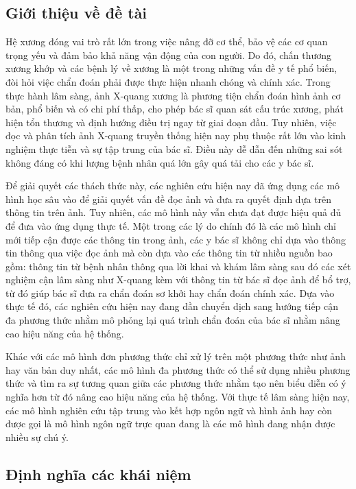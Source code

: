 \begin{refsection}
  \subsection{Giới thiệu về đề tài}

Hệ xương đóng vai trò rất lớn trong việc nâng đỡ cơ thể, bảo vệ các cơ quan trọng yếu và đảm bảo khả năng vận động của con người. Do đó, chấn thương xương khớp và các bệnh lý về xương là một trong những vấn đề y tế phổ biến, đòi hỏi việc chẩn đoán phải được thực hiện nhanh chóng và chính xác. Trong thực hành lâm sàng, ảnh X-quang xương là phương tiện chẩn đoán hình ảnh cơ bản, phổ biến và có chi phí thấp, cho phép bác sĩ quan sát cấu trúc xương, phát hiện tổn thương và định hướng điều trị ngay từ giai đoạn đầu. Tuy nhiên, việc đọc và phân tích ảnh X-quang truyền thống hiện nay phụ thuộc rất lớn vào kinh nghiệm thực tiễn và sự tập trung của bác sĩ. Điều này dễ dẫn đến những sai sót không đáng có khi lượng bệnh nhân quá lớn gây quá tải cho các y bác sĩ.

Để giải quyết các thách thức này, các nghiên cứu hiện nay đã ứng dụng các mô hình học sâu vào để giải quyết vấn đề đọc ảnh và đưa ra quyết định dựa trên thông tin trên ảnh. Tuy nhiên, các mô hình này vẫn chưa đạt được hiệu quả đủ để đưa vào ứng dụng thực tế. Một trong các lý do chính đó là các mô hình chỉ mới tiếp cận được các thông tin trong ảnh, các y bác sĩ không chỉ dựa vào thông tin thông qua việc đọc ảnh mà còn dựa vào các thông tin từ nhiều nguồn bao gồm: thông tin từ bệnh nhân thông qua lời khai và khám lâm sàng sau đó các xét nghiệm cận lâm sàng như X-quang kèm với thông tin từ bác sĩ đọc ảnh để bổ trợ, từ đó giúp bác sĩ đưa ra chẩn đoán sơ khởi hay chẩn đoán chính xác. Dựa vào thực tế đó, các nghiên cứu hiện nay đang dần chuyển dịch sang hướng tiếp cận đa phương thức nhằm mô phỏng lại quá trình chẩn đoán của bác sĩ nhằm nâng cao hiệu năng của hệ thống.

Khác với các mô hình đơn phương thức chỉ xử lý trên một phương thức như ảnh hay văn bản duy nhất, các mô hình đa phương thức có thể sử dụng nhiều phương thức và tìm ra sự tương quan giữa các phương thức nhằm tạo nên biểu diễn có ý nghĩa hơn từ đó nâng cao hiệu năng của hệ thống. Với thực tế lâm sàng hiện nay, các mô hình nghiên cứu tập trung vào kết hợp ngôn ngữ và hình ảnh hay còn được gọi là mô hình ngôn ngữ trực quan đang là các mô hình đang nhận được nhiều sự chú ý.

  \subsection{Định nghĩa các khái niệm}

\end{refsection}
